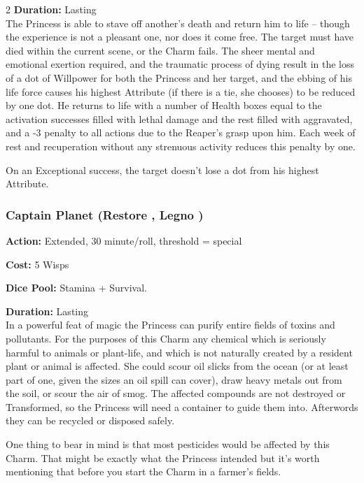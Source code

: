 \begin{multicols}{2}
\noindent \textbf{Duration:} Lasting \\

\noindent The Princess is able to stave off another's death and return him to life -- though the experience is not a pleasant one, nor does it come free. The target must have died within the current scene, or the Charm fails. The sheer mental and emotional exertion required, and the traumatic process of dying result in the loss of a dot of Willpower for both the Princess and her target, and the ebbing of his life force causes his highest Attribute (if there is a tie, she chooses) to be reduced by one dot. He returns to life with a number of Health boxes equal to the activation successes filled with lethal damage and the rest filled with aggravated, and a -3 penalty to all actions due to the Reaper's grasp upon him. Each week of rest and recuperation without any strenuous activity reduces this penalty by one.

On an Exceptional success, the target doesn't lose a dot from his highest Attribute.

\subsubsection*{Captain Planet (Restore \textbullet\textbullet\textbullet\textbullet\textbullet, Legno \textbullet\textbullet\textbullet)}

\noindent \textbf{Action:} Extended, 30 minute/roll, threshold = special

\noindent \textbf{Cost:} 5 Wisps

\noindent \textbf{Dice Pool:} Stamina + Survival.

\noindent \textbf{Duration:} Lasting \\

\noindent In a powerful feat of magic the Princess can purify entire fields of toxins and pollutants. For the purposes of this Charm any chemical which is seriously harmful to animals or plant-life, and which is not naturally created by a resident plant or animal is affected. She could scour oil slicks from the ocean (or at least part of one, given the sizes an oil spill can cover), draw heavy metals out from the soil, or scour the air of smog. The affected compounds are not destroyed or Transformed, so the Princess will need a container to guide them into. Afterwords they can be recycled or disposed safely.

One thing to bear in mind is that most pesticides would be affected by this Charm. That might be exactly what the Princess intended but it's worth mentioning that before you start the Charm in a farmer's fields. 


\end{multicols}
